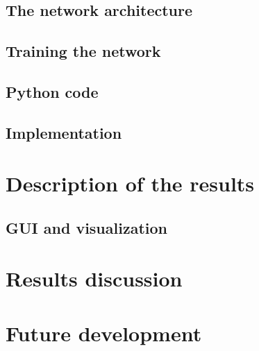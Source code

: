 \documentclass[12pt]{article}
\begin{document}
\subsection{The network architecture}

\subsection{Training the network}
\subsection{Python code}
\subsection{Implementation}
\section{Description of the results}
\subsection{GUI and visualization}
\section{Results discussion}
\section{Future development}
\newpage
\end{document}

